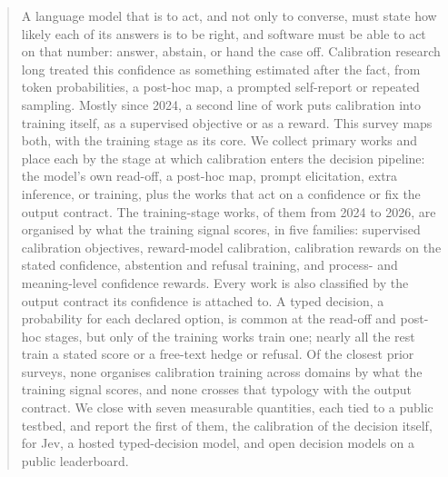 \begin{abstract}
A language model that is to act, and not only to converse, must state how likely each of its answers is
to be right, and software must be able to act on that number: answer, abstain, or hand the case off.
Calibration research long treated this confidence as something estimated after the fact, from token
probabilities, a post-hoc map, a prompted self-report or repeated sampling. Mostly since 2024, a second line
of work puts calibration into training itself, as a supervised objective or as a reward. This survey maps
both, with the training stage as its core. We collect \nWorks primary works and place each by
the stage at which calibration enters the decision pipeline: the model's own read-off, a post-hoc map,
prompt elicitation, extra inference, or training, plus the works that act on a confidence or fix the
output contract. The \nCore training-stage works, \nCoreRecent of them from 2024 to 2026, are organised
by what the training signal scores, in five families: supervised calibration objectives, reward-model
calibration, calibration rewards on the stated confidence, abstention and refusal training, and
process- and meaning-level confidence rewards. Every work is also classified by the output contract its
confidence is attached to. A typed decision, a probability for each declared
option, is common at the read-off and post-hoc stages, but only \nCoreTyped of the \nCore training works train
one; nearly all the rest train a stated score or a free-text hedge or refusal. Of the
\nSurveysCompared closest prior surveys, none organises calibration training across domains by what the
training signal scores, and none crosses that typology with the output contract. We close with seven
measurable quantities, each tied to a public testbed, and report the first of them, the calibration of
the decision itself, for Jev, a hosted typed-decision model, and \nDIOpen open decision models on a public
leaderboard.
\end{abstract}
